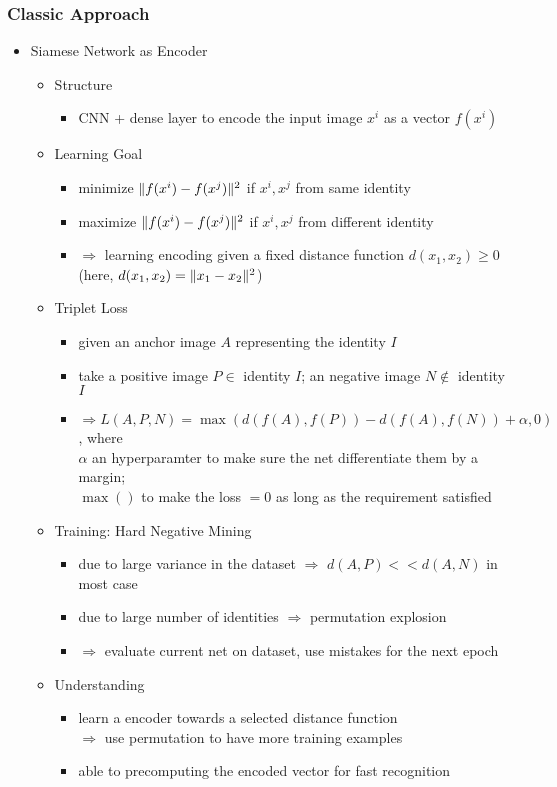 \subsubsection{Classic Approach}
\begin{itemize}
\item Siamese Network as Encoder
	\begin{itemize}
	\item Structure
		\begin{itemize}
		\item CNN + dense layer to encode the input image $x^i$ as a vector $f(x^i)$
		\end{itemize}
	\item Learning Goal
		\begin{itemize}
		\item minimize $\lVert f(x^i)-f(x^j)\rVert^2$ if $x^i, x^j$ from same identity
		\item maximize $\lVert f(x^i)-f(x^j)\rVert^2$ if $x^i, x^j$ from different identity
		\item $\Rightarrow$ learning encoding given a fixed distance function $d(x_1, x_2) \ge 0$\\
		(here, $d(x_1, x_2)=\lVert x_1-x_2\rVert^2$)
		\end{itemize}
	\item Triplet Loss
		\begin{itemize}
		\item given an anchor image $A$ representing the identity $I$
		\item take a positive image $P\in$ identity $I$; an negative image $N\not\in$ identity $I$
		\item $\Rightarrow L(A,P,N) = \max\left( d(f(A), f(P)) - d(f(A), f(N)) + \alpha, 0 \right)$, where \\
		$\alpha$ an hyperparamter to make sure the net differentiate them by a margin; \\
		$\max()$ to make the loss $=0$ as long as the requirement satisfied
		\end{itemize}
	\item Training: Hard Negative Mining
		\begin{itemize}
		\item due to large variance in the dataset $\Rightarrow$ $d(A,P) << d(A,N)$ in most case
		\item due to large number of identities $\Rightarrow$ permutation explosion
		\item $\Rightarrow$ evaluate current net on dataset, use mistakes for the next epoch
		\end{itemize}
	\item Understanding
		\begin{itemize}
		\item learn a encoder towards a selected distance function \\
		$\Rightarrow$ use permutation to have more training examples
		\item able to precomputing the encoded vector for fast recognition
		\end{itemize}
	\end{itemize}


\end{itemize}
